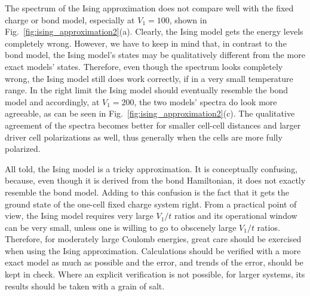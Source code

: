 The spectrum of the Ising approximation does not compare well with the fixed charge
or bond model, especially at $V_1 = 100$, shown in
Fig.~\ref{fig:ising_approximation2}(a). Clearly, the Ising model gets the energy
levels completely wrong. However, we have to keep in mind that, in contrast to
the bond model, the Ising model's states may be qualitatively different from the
more exact models' states. Therefore, even though the spectrum looks completely
wrong, the Ising model still does work correctly, if in a very small temperature
range. In the right limit the Ising model should eventually resemble the bond
model and accordingly, at $V_1 = 200$, the two models' spectra do look more
agreeable, as can be seen in Fig.~\ref{fig:ising_approximation2}(c). The
qualitative agreement of the spectra becomes better for smaller cell-cell
distances and larger driver cell polarizations as well, thus generally when the
cells are more fully polarized.

All told, the Ising model is a tricky approximation. It is conceptually
confusing, because, even though it is derived from the bond Hamiltonian, it does
not exactly resemble the bond model. Adding to this confusion is the fact that
it gets the ground state of the one-cell fixed charge system right. From a
practical point of view, the Ising model requires very large $V_1/t$ ratios and
its operational window can be very small, unless one is willing to go to
obscenely large $V_1/t$ ratios. Therefore, for moderately large Coulomb
energies, great care should be exercised when using the Ising approximation.
Calculations should be verified with a more exact model as much as possible and the
error, and trends of the error, should be kept in check. Where an explicit
verification is not possible, for larger systems, its results should be taken
with a grain of salt.

